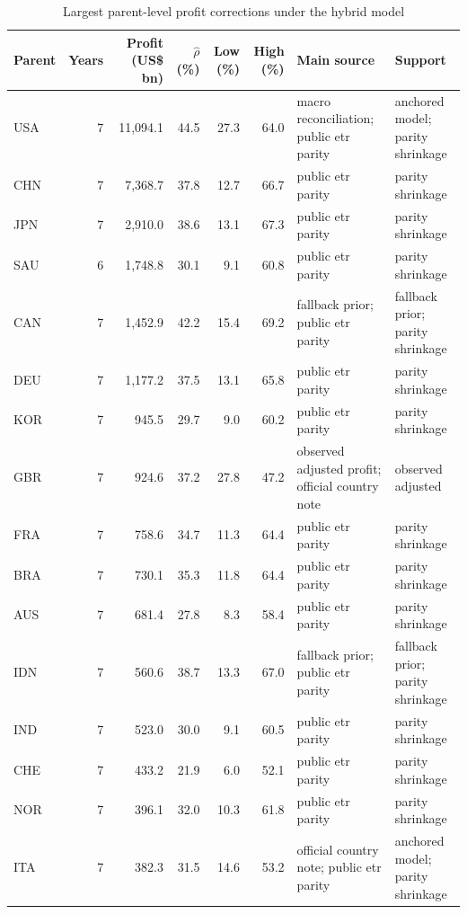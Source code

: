 \begin{table}[H]
\centering
\footnotesize
\setlength{\tabcolsep}{3pt}
\caption{Largest parent-level profit corrections under the hybrid model}
\label{tab:profit_correction_parent_year_top20}
\begin{adjustbox}{max width=\textwidth,center}
\begin{tabular}{@{}lrrrrrL{3.0cm}L{2.7cm}@{}}
\toprule
Parent & Years & Profit (US\$ bn) & $\hat{\rho}$ (\%) & Low (\%) & High (\%) & Main source & Support \\
\midrule
USA & 7 & 11,094.1 & 44.5 & 27.3 & 64.0 & macro reconciliation; public etr parity & anchored model; parity shrinkage \\
CHN & 7 &  7,368.7 & 37.8 & 12.7 & 66.7 & public etr parity & parity shrinkage \\
JPN & 7 &  2,910.0 & 38.6 & 13.1 & 67.3 & public etr parity & parity shrinkage \\
SAU & 6 &  1,748.8 & 30.1 &  9.1 & 60.8 & public etr parity & parity shrinkage \\
CAN & 7 &  1,452.9 & 42.2 & 15.4 & 69.2 & fallback prior; public etr parity & fallback prior; parity shrinkage \\
DEU & 7 &  1,177.2 & 37.5 & 13.1 & 65.8 & public etr parity & parity shrinkage \\
KOR & 7 &    945.5 & 29.7 &  9.0 & 60.2 & public etr parity & parity shrinkage \\
GBR & 7 &    924.6 & 37.2 & 27.8 & 47.2 & observed adjusted profit; official country note & observed adjusted \\
FRA & 7 &    758.6 & 34.7 & 11.3 & 64.4 & public etr parity & parity shrinkage \\
BRA & 7 &    730.1 & 35.3 & 11.8 & 64.4 & public etr parity & parity shrinkage \\
AUS & 7 &    681.4 & 27.8 &  8.3 & 58.4 & public etr parity & parity shrinkage \\
IDN & 7 &    560.6 & 38.7 & 13.3 & 67.0 & fallback prior; public etr parity & fallback prior; parity shrinkage \\
IND & 7 &    523.0 & 30.0 &  9.1 & 60.5 & public etr parity & parity shrinkage \\
CHE & 7 &    433.2 & 21.9 &  6.0 & 52.1 & public etr parity & parity shrinkage \\
NOR & 7 &    396.1 & 32.0 & 10.3 & 61.8 & public etr parity & parity shrinkage \\
ITA & 7 &    382.3 & 31.5 & 14.6 & 53.2 & official country note; public etr parity & anchored model; parity shrinkage \\

\end{tabular}
\end{adjustbox}
\end{table}

